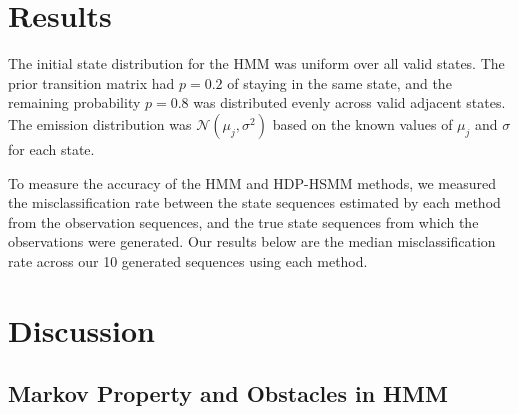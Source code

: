 \documentclass{article}
\begin{document}
\section{Results}

The initial state distribution for the HMM was uniform over all valid states. The prior transition matrix had $p = 0.2$ of staying in the same state, and the remaining probability $p = 0.8$ was distributed evenly across valid adjacent states. The emission distribution was $\mathcal{N}(\mu_j, \sigma^2)$ based on the known values of $\mu_j$ and $\sigma$ for each state.

To measure the accuracy of the HMM and HDP-HSMM methods, we measured the misclassification rate between the state sequences estimated by each method from the observation sequences, and the true state sequences from which the observations were generated. Our results below are the median misclassification rate across our 10 generated sequences using each method.

\begin{table}[H]	
	\centering
	
\end{table}


\section{Discussion}

\subsection{Markov Property and Obstacles in HMM}
\end{document}
